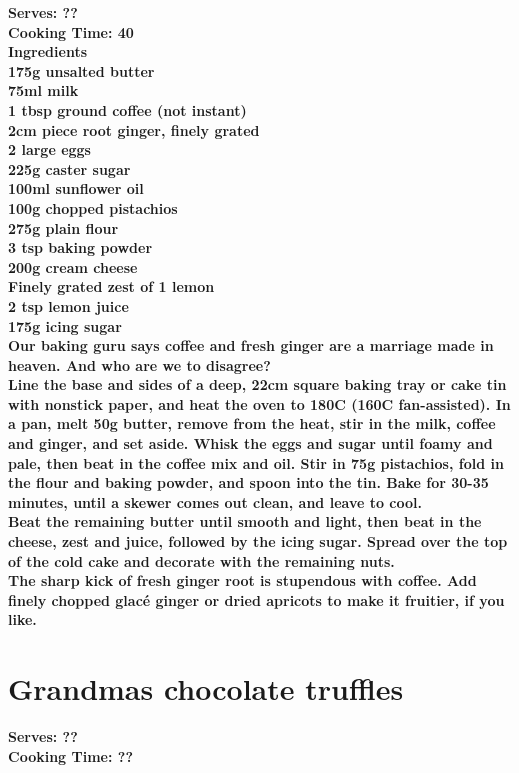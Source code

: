 \documentclass[18pt, oneside]{book}
\begin{document}
\bf{Serves: ??} \\
\bf{Cooking Time: 40} \\

\bf{Ingredients} \normalfont \\
175g unsalted butter \\
75ml milk \\
1 tbsp ground coffee (not instant) \\
2cm piece root ginger, finely grated \\
2 large eggs \\
225g caster sugar \\
100ml sunflower oil \\
100g chopped pistachios \\
275g plain flour \\
3 tsp baking powder \\
200g cream cheese \\
Finely grated zest of 1 lemon \\
2 tsp lemon juice \\
175g icing sugar \\
 
Our baking guru says coffee and fresh ginger are a marriage made in heaven. And who are we to disagree? \\

Line the base and sides of a deep, 22cm square baking tray or cake tin with nonstick paper, and heat the oven to 180C (160C fan-assisted). In a pan, melt 50g butter, remove from the heat, stir in the milk, coffee and ginger, and set aside. Whisk the eggs and sugar until foamy and pale, then beat in the coffee mix and oil. Stir in 75g pistachios, fold in the flour and baking powder, and spoon into the tin. Bake for 30-35 minutes, until a skewer comes out clean, and leave to cool. \\

Beat the remaining butter until smooth and light, then beat in the cheese, zest and juice, followed by the icing sugar. Spread over the top of the cold cake and decorate with the remaining nuts. \\

The sharp kick of fresh ginger root is stupendous with coffee. Add finely chopped glacé ginger or dried apricots to make it fruitier, if you like.  \\

\section{Grandmas chocolate truffles}
\bf{Serves: ??} \\
\bf{Cooking Time: ??} \\
\end{document}
